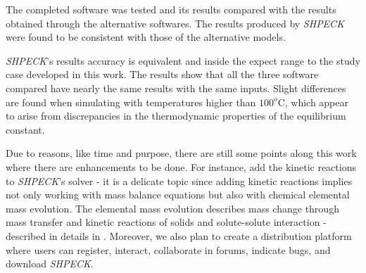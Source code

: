 The completed software was tested and its results compared with the results obtained through the alternative softwares. 
The results produced by \emph{SHPECK} were found to be consistent with those of the alternative models.

\emph{SHPECK}'s results accuracy is equivalent and inside the expect range to the study case developed in this work. The results show that all the three software compared have nearly the same results with the same inputs. Slight differences are found when simulating with temperatures higher than $100^o$C, which appear to arise from discrepancies in the thermodynamic properties of the equilibrium constant.

Due to reasons, like time and purpose, there are still some points along this work where there are enhancements to be done. For instance, add the kinetic reactions to \emph{SHPECK}'s solver - it is a  delicate topic since adding kinetic reactions implies not only working with mass balance equations but also with chemical elemental mass evolution. The elemental mass evolution describes mass change through mass transfer and kinetic reactions of solids and solute-solute interaction - described in details in \cite{Ajpark:14}.
Moreover, we also plan to create a distribution platform where users can register, interact, collaborate in forums, indicate bugs, and download \emph{SHPECK}.

